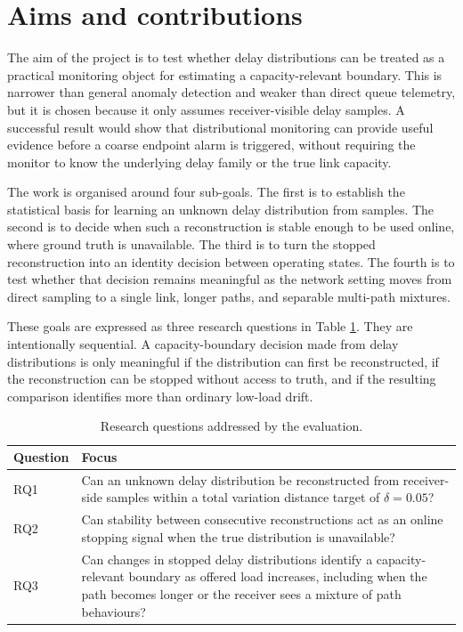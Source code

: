 \section{Aims and contributions}

The aim of the project is to test whether delay distributions can be treated as a practical monitoring object for estimating a capacity-relevant boundary. This is narrower than general anomaly detection and weaker than direct queue telemetry, but it is chosen because it only assumes receiver-visible delay samples. A successful result would show that distributional monitoring can provide useful evidence before a coarse endpoint alarm is triggered, without requiring the monitor to know the underlying delay family or the true link capacity.

The work is organised around four sub-goals. The first is to establish the statistical basis for learning an unknown delay distribution from samples. The second is to decide when such a reconstruction is stable enough to be used online, where ground truth is unavailable. The third is to turn the stopped reconstruction into an identity decision between operating states. The fourth is to test whether that decision remains meaningful as the network setting moves from direct sampling to a single link, longer paths, and separable multi-path mixtures.

These goals are expressed as three research questions in Table \ref{tab:research-questions}. They are intentionally sequential. A capacity-boundary decision made from delay distributions is only meaningful if the distribution can first be reconstructed, if the reconstruction can be stopped without access to truth, and if the resulting comparison identifies more than ordinary low-load drift.

\begin{table}[htbp]
\centering
\small
\begin{tabular}{p{}p{}}
\toprule
Question & Focus \\
\midrule
RQ1 & Can an unknown delay distribution be reconstructed from receiver-side samples within a total variation distance target of \(\delta=0.05\)? \\
RQ2 & Can stability between consecutive reconstructions act as an online stopping signal when the true distribution is unavailable? \\
RQ3 & Can changes in stopped delay distributions identify a capacity-relevant boundary as offered load increases, including when the path becomes longer or the receiver sees a mixture of path behaviours? \\
\bottomrule
\end{tabular}
\caption{Research questions addressed by the evaluation.}
\label{tab:research-questions}
\end{table}

